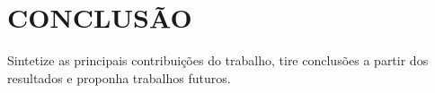 \chapter{CONCLUSÃO}

Sintetize as principais contribuições do trabalho, tire conclusões a partir dos resultados e proponha trabalhos futuros.

